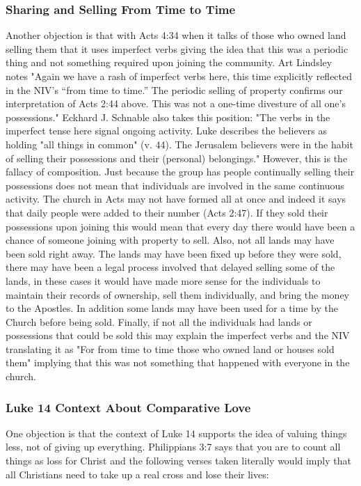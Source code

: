 \documentclass[11pt]{article}
\begin{document}
\subsubsection{Sharing and Selling From Time to Time}
Another objection is that with Acts 4:34 when it talks of those who owned land selling them that it uses imperfect verbs giving the idea that this was a periodic thing and not something required upon joining the community. Art Lindsley notes "Again we have a rash of imperfect verbs here, this time explicitly reflected in the NIV’s “from time to time.” The periodic selling of property confirms our interpretation of Acts 2:44 above. This was not a one-time divesture of all one’s possessions." \cite{gospel coalition} Eckhard J. Schnable also takes this position: "The verbs in the imperfect tense here signal ongoing activity. Luke describes the believers as holding "all things in common" (v. 44). The Jerusalem believers were in the habit of selling their possessions and their (personal) belongings." \cite{habit selling possessions} However, this is the fallacy of composition. Just because the group has people continually selling their possessions does not mean that individuals are involved in the same continuous activity. The church in Acts may not have formed all at once and indeed it says that daily people were added to their number (Acts 2:47). If they sold their possessions upon joining this would mean that every day there would have been a chance of someone joining with property to sell. Also, not all lands may have been sold right away. The lands may have been fixed up before they were sold, there may have been a legal process involved that delayed selling some of the lands, in these cases it would have made more sense for the individuals to maintain their records of ownership, sell them individually, and bring the money to the Apostles. In addition some lands may have been used for a time by the Church before being sold. 
Finally, if not all the individuals had lands or possessions that could be sold this may explain the imperfect verbs and the NIV translating it as "For from time to time those who owned land or houses sold them" implying that this was not something that happened with everyone in the church.

\subsubsection{Luke 14 Context About Comparative Love}
One objection is that the context of Luke 14 supports the idea of valuing things less, not of giving up everything. Philippians 3:7 says that you are to count all things as loss for Christ and the following verses taken literally would imply that all Christians need to take up a real cross and lose their lives:
\end{document}
